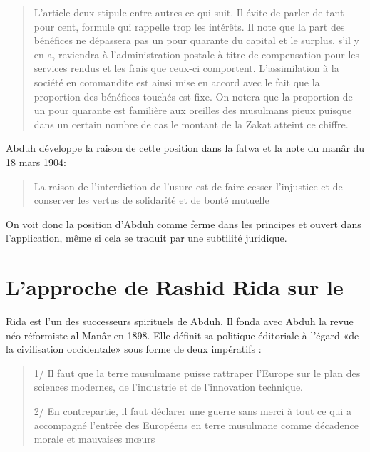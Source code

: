 \begin{quote}
    L'article deux stipule entre autres ce qui suit. Il évite de parler de tant pour
cent, formule qui rappelle trop les intérêts. Il note que la part des bénéfices ne
dépassera pas un pour quarante du capital et le surplus, s'il y en a, reviendra à
l'administration postale à titre de compensation pour les services rendus et les
frais que ceux-ci comportent. L'assimilation à la société en commandite est ainsi
mise en accord avec le fait que la proportion des bénéfices touchés est fixe. On
notera que la proportion de un pour quarante est familière aux oreilles des
musulmans pieux puisque dans un certain nombre de cas le montant de la Zakat
atteint ce chiffre.
\end{quote}


Abduh développe la raison de cette position dans la fatwa et la note du manâr du 18 mars 1904: 
\begin{quote}
    La raison de l'interdiction de l'usure est de faire cesser l'injustice et de conserver les vertus de solidarité et de bonté mutuelle
\end{quote}
On voit donc la position d'Abduh comme ferme dans les principes et ouvert dans l'application, même si cela se traduit par une subtilité juridique. 

\section{L'approche de Rashid Rida sur le \riba}
 

Rida est l'un des successeurs spirituels de Abduh. Il fonda avec Abduh la revue néo-réformiste al-Manâr en   1898. Elle définit sa politique éditoriale à l’égard «de la civilisation occidentale» sous forme de deux impératifs : 
\begin{quote}
    \item  1/ Il faut que la terre musulmane puisse rattraper l’Europe sur le plan des sciences modernes, de l’industrie et de l’innovation technique. 
    \item 2/ En contrepartie, il faut déclarer une guerre sans merci à tout ce qui a accompagné l’entrée des Européens en terre musulmane comme décadence morale et mauvaises mœurs
\end{quote}


